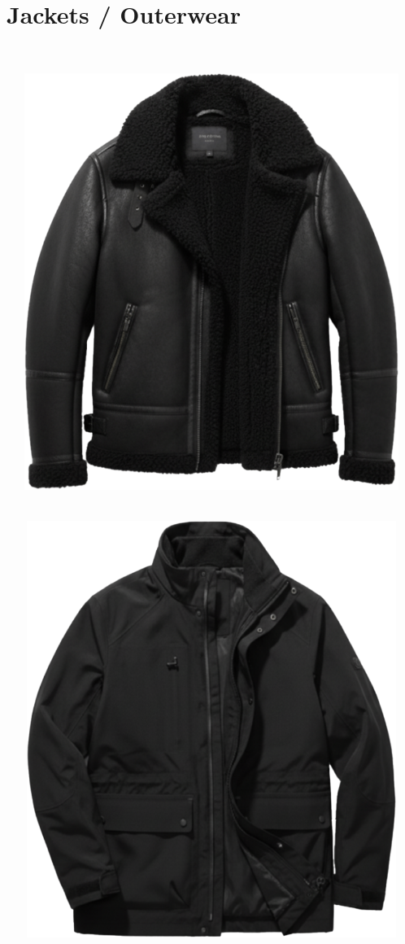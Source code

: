 \documentclass[10pt]{article}
\begin{document}
\section*{Jackets / Outerwear}\
\vspace*{2mm}\noindent
\begin{minipage}[c][135.50mm][c]{135.50mm}\centering
\includegraphics[width=135.50mm,height=135.50mm,keepaspectratio]{assets/jackets/black-montone.png}\
\end{minipage} \hspace*{6.00mm} \begin{minipage}[c][135.50mm][c]{135.50mm}\centering
\includegraphics[width=135.50mm,height=135.50mm,keepaspectratio]{assets/jackets/black-parka-waterproof.png}\
\end{minipage}\
\newpage
\end{document}
